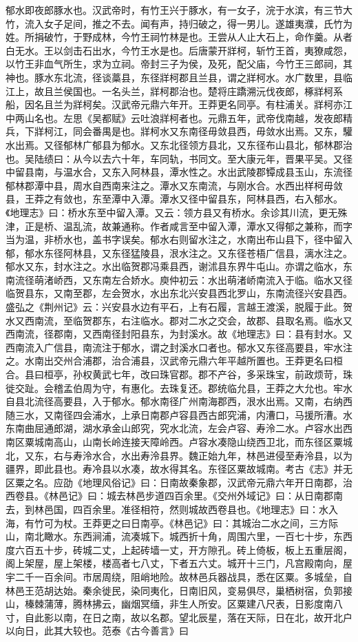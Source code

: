 \documentclass[12pt,UTF8]{ctexbook}
\begin{document}
郁水即夜郎豚水也。汉武帝时，有竹王兴于豚水，有一女子，浣于水滨，有三节大竹，流入女子足间，推之不去。闻有声，持归破之，得一男儿。遂雄夷濮，氏竹为姓。所捐破竹，于野成林，今竹王祠竹林是也。王尝从人止大石上，命作羹。从者白无水。王以剑击石出水，今竹王水是也。后唐蒙开牂柯，斩竹王首，夷獠咸怨，以竹王非血气所生，求为立祠。帝封三子为侯，及死，配父庙，今竹王三郎祠，其神也。豚水东北流，径谈藁县，东径牂柯郡且兰县，谓之牂柯水。水广数里，县临江上，故且兰侯国也。一名头兰，牂柯郡治也。楚将庄蹻溯沅伐夜郎，椓牂柯系船，因名且兰为牂柯矣。汉武帝元鼎六年开。王莽更名同亭。有柱浦关。牂柯亦江中两山名也。左思《吴都赋》云吐浪牂柯者也。元鼎五年，武帝伐南越，发夜郎精兵，下牂柯江，同会番禺是也。牂柯水又东南径毋敛县西，毋敛水出焉。又东，驩水出焉。又径郁林广郁县为郁水。又东北径领方县北，又东径布山县北，郁林郡治也。吴陆绩曰：从今以去六十年，车同轨，书同文。至大康元年，晋果平吴。又径中留县南，与温水合，又东入阿林县，潭水性之。水出武陵郡镡成县玉山，东流径郁林郡潭中县，周水自西南来注之。潭水又东南流，与刚水合。水西出样柯毋敛县，王莽之有敛也，东至潭中入潭。潭水又径中留县东，阿林县西，右入郁水。《地理志》曰：桥水东至中留入潭。又云：领方县又有桥水。余诊其川流，更无殊津，正是桥、温乱流，故兼通称。作者咸言至中留入潭，潭水又得郁之兼称，而字当为温，非桥水也，盖书字误矣。郁水右则留水注之，水南出布山县下，径中留入郁，郁水东径阿林县，又东径猛陵县，泿水注之。又东径苍梧广信县，漓水注之。郁水又东，封水注之。水出临贺郡冯乘县西，谢沭县东界牛屯山。亦谓之临水，东南流径萌渚峤西，又东南左合娇水。庾仲初云：水出萌渚峤南流入于临。临水又径临贺县东，又南至郡，左会贺水，水出东北兴安县西北罗山，东南流径兴安县西。盛弘之《荆州记》云：兴安县水边有平石，上有石履，言越王渡溪，脱履于此。贺水又西南流，至临贺郡东，右注临水。郡对二水之交会，故郡、县取名焉。临水又西南流，径郡南，又西南径封阳县东，为封溪水。故《地理志》曰：县有封水。又西南流入广信县，南流注于郁水，谓之封溪水口者也。郁水又东径高要县，牢水注之。水南出交州合浦郡，治合浦县，汉武帝元鼎六年平越所置也。王莽更名曰桓合。县曰桓亭，孙权黄武七年，改曰珠官郡。郡不产谷，多采珠宝，前政烦苛，珠徙交趾。会稽孟伯周为守，有惠化。去珠复还。郡统临允县，王莽之大允也。牢水自县北流径高要县，入于郁水。郁水南径广州南海郡西，泿水出焉。又南，右纳西随三水，又南径四会浦水，上承日南郡卢容县西古郎究浦，内漕口，马援所漕。水东南曲屈通郎湖，湖水承金山郎究，究水北流，左会卢容、寿泠二水。卢容水出西南区粟城南高山，山南长岭连接天障岭西。卢容水凑隐山绕西卫北，而东径区粟城北，又东，右与寿泠水合，水出寿泠县界。魏正始九年，林邑进侵至寿泠县，以为疆界，即此县也。寿冷县以水凑，故水得其名。东径区粟故城南。考古《志》并无区粟之名。应劭《地理风俗记》曰：日南故秦象郡，汉武帝元鼎六年开日南郡，治西卷县。《林邑记》曰：城去林邑步道四百余里。《交州外域记》曰：从日南郡南去，到林邑国，四百余里。准径相符，然则城故西卷县也。《地理志》曰：水入海，有竹可为杖。王莽更之曰日南亭。《林邑记》曰：其城治二水之间，三方际山，南北瞰水。东西涧浦，流凑城下。城西折十角，周围六里，一百七十步，东西度六百五十步，砖城二丈，上起砖墙一丈，开方隙孔。砖上倚板，板上五重层阁，阁上架屋，屋上架楼，楼高者七八丈，下者五六丈。城开十三门，凡宫殿南向，屋宇二千一百余间。市居周绕，阻峭地险。故林邑兵器战具，悉在区粟。多城垒，自林邑王范胡达始。秦余徙民，染同夷化，日南旧风，变易俱尽，巢栖树宿，负郭接山，榛棘蒲薄，腾林拂云，幽烟冥缅，非生人所安。区粟建八尺表，日影度南八寸，自此影以南，在日之南，故以名郡。望北辰星，落在天际，日在北，故开北户以向日，此其大较也。范泰《古今善言》曰
\end{document}
